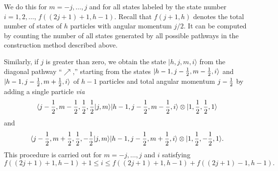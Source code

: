 \documentclass[rmp,amsfonts,showpacs,showkeys,preprint]{revtex4}
\begin{document}
We do this
for $m= -j,\ldots,j$ and for all states labeled by the state number $i= 1,2,\ldots$, $f((2j+1)+1,h-1)$.
Recall that
$f(j+1,h)$ denotes the total number of
states of $h$ particles with angular momentum $j/2$.
It can be computed by counting the number of all states generated by all possible pathways in the construction method described above.

Similarly, if $j$ is greater than
zero, we obtain the
state  $|h,j,m,i\rangle$
from the diagonal pathway ``{\color{blue}$\nearrow$},''
starting from
the states $|h-1,j-{1\over2},m-{1\over2},i\rangle$ and
$|h-1,j-{1\over2},m+{1\over2},i\rangle$ of $h-1$ particles and total angular momentum $j-{1\over2}$
 by adding a single particle {\it via}
\begin{equation}\langle
j-{1\over2},m-{1\over2},{1\over2},{1\over2}|j,m\rangle|h-1,j-{1\over2},m-{1\over2},i\rangle\otimes|1,{1\over2},{1\over2},1\rangle
\end{equation}
and
\begin{equation}\langle
j-{1\over2},m+{1\over2},{1\over2},-{1\over2}|j,m\rangle|h-1,j-{1\over2},m+{1\over2},i\rangle\otimes|1,{1\over2},-{1\over2},1\rangle .
\end{equation}
This procedure is carried out for $m= -j,\ldots,j$ and $i$ satisfying
\begin{equation}
f((2j+1)+1,h-1)+1 \le i \le f((2j+1)+1,h-1)+f((2j+1)-1,h-1).
\end{equation}

\end{document}
